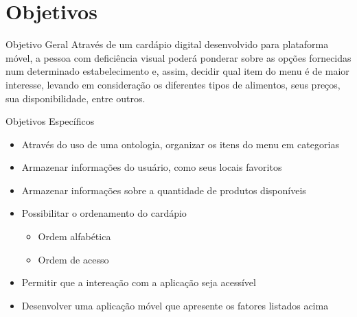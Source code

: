 \section{Objetivos}\label{sec:objetivos}
\begin{frame}{Objetivo Geral}
	Através de um cardápio digital desenvolvido para plataforma móvel, a pessoa com deficiência visual poderá ponderar sobre as opções fornecidas num determinado estabelecimento e, assim, decidir qual item do menu é de maior interesse, levando em consideração os diferentes tipos de alimentos, seus preços, sua disponibilidade, entre outros.
\end{frame}

\begin{frame}[allowframebreaks]{Objetivos Específicos}
	\begin{itemize}
		\setlength{\itemsep}{1em}
		\item<1-> Através do uso de uma ontologia, organizar os itens do menu em categorias
		\item<1-> Armazenar informações do usuário, como seus locais favoritos
		\item<1-> Armazenar informações sobre a quantidade de produtos disponíveis
		\framebreak
		\item<1-> Possibilitar o ordenamento do cardápio
			\begin{itemize}
				\setlength{\itemsep}{0.5em}
				\item<1-> Ordem alfabética
				\item<1-> Ordem de acesso
			\end{itemize}
		\item<1-> Permitir que a intereação com a aplicação seja acessível
		\item<1-> Desenvolver uma aplicação móvel que apresente os fatores listados acima
	\end{itemize}
\end{frame}